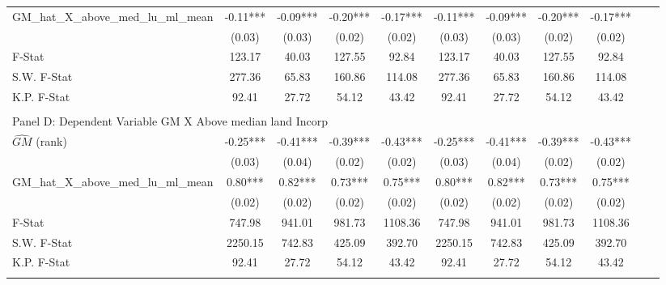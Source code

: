 \begin{table}[htbp]
\begin{threeparttable}
\begin{tabular}{l*{10}{c}}
\addlinespace
GM\_hat\_X\_above\_med\_lu\_ml\_mean&      -0.11***&      -0.09***&      -0.20***&      -0.17***&      -0.11***&      -0.09***&      -0.20***&      -0.17***\\
                &     (0.03)   &     (0.03)   &     (0.02)   &     (0.02)   &     (0.03)   &     (0.03)   &     (0.02)   &     (0.02)   \\
\midrule
F-Stat          &     123.17   &      40.03   &     127.55   &      92.84   &     123.17   &      40.03   &     127.55   &      92.84   \\
S.W. F-Stat     &     277.36   &      65.83   &     160.86   &     114.08   &     277.36   &      65.83   &     160.86   &     114.08   \\
K.P. F-Stat     &      92.41   &      27.72   &      54.12   &      43.42   &      92.41   &      27.72   &      54.12   &      43.42   \\
\cmidrule[\heavyrulewidth](lr){1-9} \\ \cmidrule[\heavyrulewidth](lr){1-9}
\multicolumn{8}{l}{Panel D: Dependent Variable GM X Above median land Incorp}\\
\cmidrule(lr){1-9}
$\hat{GM}$ (rank)&      -0.25***&      -0.41***&      -0.39***&      -0.43***&      -0.25***&      -0.41***&      -0.39***&      -0.43***\\
                &     (0.03)   &     (0.04)   &     (0.02)   &     (0.02)   &     (0.03)   &     (0.04)   &     (0.02)   &     (0.02)   \\
\addlinespace
GM\_hat\_X\_above\_med\_lu\_ml\_mean&       0.80***&       0.82***&       0.73***&       0.75***&       0.80***&       0.82***&       0.73***&       0.75***\\
                &     (0.02)   &     (0.02)   &     (0.02)   &     (0.02)   &     (0.02)   &     (0.02)   &     (0.02)   &     (0.02)   \\
\midrule
F-Stat          &     747.98   &     941.01   &     981.73   &    1108.36   &     747.98   &     941.01   &     981.73   &    1108.36   \\
S.W. F-Stat     &    2250.15   &     742.83   &     425.09   &     392.70   &    2250.15   &     742.83   &     425.09   &     392.70   \\
K.P. F-Stat     &      92.41   &      27.72   &      54.12   &      43.42   &      92.41   &      27.72   &      54.12   &      43.42   \\
\cmidrule[\heavyrulewidth](lr){1-9} \\ \cmidrule[\heavyrulewidth](lr){1-9}

\end{tabular}
\end{threeparttable}
\end{table}
